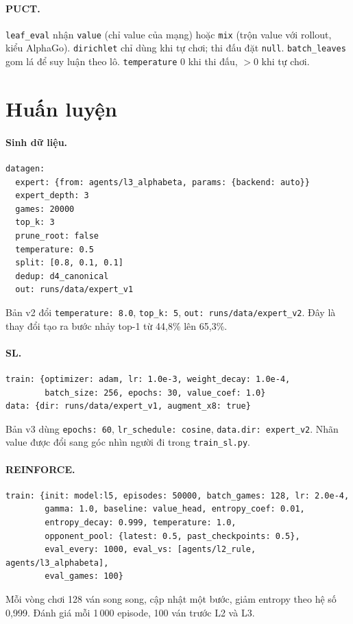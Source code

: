\paragraph{PUCT.} \texttt{leaf\_eval} nhận \texttt{value} (chỉ value của mạng) hoặc \texttt{mix}
(trộn value với rollout, kiểu AlphaGo). \texttt{dirichlet} chỉ dùng khi tự chơi; thi đấu đặt
\texttt{null}. \texttt{batch\_leaves} gom lá để suy luận theo lô. \texttt{temperature} 0 khi
thi đấu, $>0$ khi tự chơi.

\section{Huấn luyện}
\paragraph{Sinh dữ liệu.}
\begin{lstlisting}[numbers=none]
datagen:
  expert: {from: agents/l3_alphabeta, params: {backend: auto}}
  expert_depth: 3
  games: 20000
  top_k: 3
  prune_root: false
  temperature: 0.5
  split: [0.8, 0.1, 0.1]
  dedup: d4_canonical
  out: runs/data/expert_v1
\end{lstlisting}
Bản v2 đổi \texttt{temperature: 8.0}, \texttt{top\_k: 5}, \texttt{out: runs/data/expert\_v2}.
Đây là thay đổi tạo ra bước nhảy top-1 từ 44,8\% lên 65,3\%.

\paragraph{SL.}
\begin{lstlisting}[numbers=none]
train: {optimizer: adam, lr: 1.0e-3, weight_decay: 1.0e-4,
        batch_size: 256, epochs: 30, value_coef: 1.0}
data: {dir: runs/data/expert_v1, augment_x8: true}
\end{lstlisting}
Bản v3 dùng \texttt{epochs: 60}, \texttt{lr\_schedule: cosine}, \texttt{data.dir: expert\_v2}.
Nhãn value được đổi sang góc nhìn người đi trong \texttt{train\_sl.py}.

\paragraph{REINFORCE.}
\begin{lstlisting}[numbers=none]
train: {init: model:l5, episodes: 50000, batch_games: 128, lr: 2.0e-4,
        gamma: 1.0, baseline: value_head, entropy_coef: 0.01,
        entropy_decay: 0.999, temperature: 1.0,
        opponent_pool: {latest: 0.5, past_checkpoints: 0.5},
        eval_every: 1000, eval_vs: [agents/l2_rule, agents/l3_alphabeta],
        eval_games: 100}
\end{lstlisting}
Mỗi vòng chơi 128 ván song song, cập nhật một bước, giảm entropy theo hệ số 0,999. Đánh giá mỗi
1\,000 episode, 100 ván trước L2 và L3.

